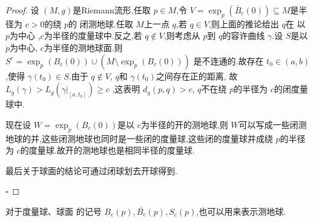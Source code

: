 \documentclass[../../几何与拓扑.tex]{subfiles}
\begin{document}
\begin{proof}
    设 \(  \left( M,g \right)   \)是Riemann流形,任取 \(  p \in M  \),令 \(  V = \exp _{p}\left( \bar{B}_{c}\left( 0 \right)  \right)\subseteq M   \)是半径为 \(  c>0  \)的绕 \(  p  \)的 闭测地球.任取 \(  M  \)上一点 \(  q  \),若 \(  q \in V  \),则上面的推论给出 \(  q  \)在 以 \(  p  \)为中心 ,\(  c  \)为半径的度量球中.反之,若 \(  q\not \in V  \),则考虑从 \(  p  \)到 \(  q  \)的容许曲线 \(   \gamma   \).设 \(  S  \)是以 \(  p  \)为中心, \(  c  \)为半径的测地球面.则 \(  S^{c}=\exp _{p}\left( B_{c}\left( 0 \right)  \right)\cup \left( M\setminus \exp _{p}\left( B_{c}\left( 0 \right)  \right)  \right)    \) 是不连通的.故存在 \(  t_0 \in \left( a,b \right)   \),使得 \(   \gamma \left( t_0 \right) \in S   \).由于 \(  q\not \in V \), \(  q \)和 \(   \gamma \left( t_0 \right)   \)之间存在正的距离,   故\(  L_{g}\left(  \gamma  \right)> L_{g}\left(  \gamma |_{[a,t_0]} \right)\ge c    \) ,这表明 \(  d _{g}\left( p,q \right)>c   \), \(  q  \)不在绕 \(  p  \)的半径为 \(  c  \)的闭度量球中.
    
    现在设 \(  W =  \exp _{p}\left( B_{c}\left( 0 \right)  \right)   \)是以 \(  c  \)为半径的开的测地球,则 \(  W  \)可以写成一些闭测地球的并,这些闭测地球也同时是一些闭的度量球,这些闭的度量球并成绕 \(  p  \)的半径为 \(  c  \)的度量球.故开的测地球也是相同半径的度量球.
    
    最后关于球面的结论可通过闭球划去开球得到.

    \hfill $\square$
\end{proof}

\begin{definition}
    对于度量球、球面 的记号 \(  B_{c}\left( p \right),\bar{B_{c}}\left( p \right),S_{c}\left( p \right)     \),也可以用来表示测地球. 
\end{definition}
\end{document}
